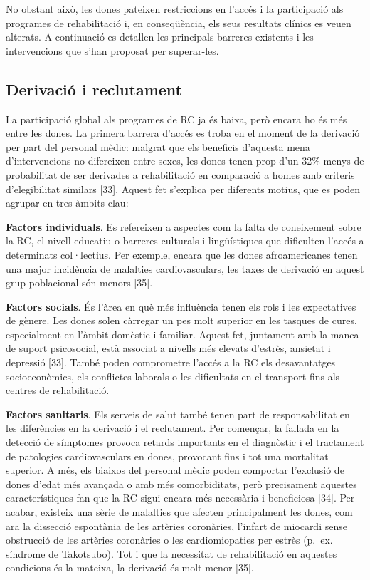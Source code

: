 \documentclass[CAT]{TFUOC}%
\begin{document}
No obstant això, les dones pateixen restriccions en l'accés i la participació als programes de rehabilitació i, en conseqüència, els seus resultats clínics es veuen alterats. A continuació es detallen les principals barreres existents i les intervencions que s'han proposat per superar-les.

\subsection{Derivació i reclutament}\label{derivaciuxf3-i-reclutament}

La participació global als programes de RC ja és baixa, però encara ho és més entre les dones. La primera barrera d'accés es troba en el moment de la derivació per part del personal mèdic: malgrat que els beneficis d'aquesta mena d'intervencions no difereixen entre sexes, les dones tenen prop d'un 32\% menys de probabilitat de ser derivades a rehabilitació en comparació a homes amb criteris d'elegibilitat similars {[}33{]}. Aquest fet s'explica per diferents motius, que es poden agrupar en tres àmbits clau:

\bigskip

\textbf{Factors individuals}. Es refereixen a aspectes com la falta de coneixement sobre la RC, el nivell educatiu o barreres culturals i lingüístiques que dificulten l'accés a determinats col·lectius. Per exemple, encara que les dones afroamericanes tenen una major incidència de malalties cardiovasculars, les taxes de derivació en aquest grup poblacional són menors {[}35{]}.

\textbf{Factors socials}. És l'àrea en què més influència tenen els rols i les expectatives de gènere. Les dones solen càrregar un pes molt superior en les tasques de cures, especialment en l'àmbit domèstic i familiar. Aquest fet, juntament amb la manca de suport psicosocial, està associat a nivells més elevats d'estrès, ansietat i depressió {[}33{]}. També poden comprometre l'accés a la RC els desavantatges socioeconòmics, els conflictes laborals o les dificultats en el transport fins als centres de rehabilitació.

\textbf{Factors sanitaris}. Els serveis de salut també tenen part de responsabilitat en les diferències en la derivació i el reclutament. Per començar, la fallada en la detecció de símptomes provoca retards importants en el diagnòstic i el tractament de patologies cardiovasculars en dones, provocant fins i tot una mortalitat superior. A més, els biaixos del personal mèdic poden comportar l'exclusió de dones d'edat més avançada o amb més comorbiditats, però precisament aquestes característiques fan que la RC sigui encara més necessària i beneficiosa {[}34{]}. Per acabar, existeix una sèrie de malalties que afecten principalment les dones, com ara la dissecció espontània de les artèries coronàries, l'infart de miocardi sense obstrucció de les artèries coronàries o les cardiomiopaties per estrès (p.~ex. síndrome de Takotsubo). Tot i que la necessitat de rehabilitació en aquestes condicions és la mateixa, la derivació és molt menor {[}35{]}.
\end{document}
